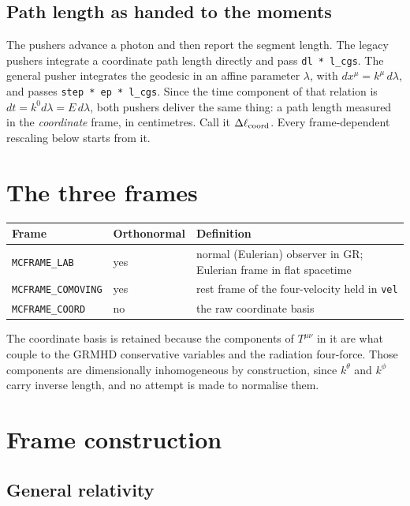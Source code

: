 \documentclass[11pt]{article}
\begin{document}
\subsection{Path length as handed to the moments}

The pushers advance a photon and then report the segment length. The legacy pushers
integrate a coordinate path length directly and pass \texttt{dl * l\_cgs}. The general
pusher integrates the geodesic in an affine parameter $\lambda$, with
$dx^\mu = k^\mu \, d\lambda$, and passes \texttt{step * ep * l\_cgs}. Since the time
component of that relation is $dt = k^0 d\lambda = E\, d\lambda$, both pushers deliver the
same thing: a path length measured in the \emph{coordinate} frame, in centimetres. Call it
$\Delta \ell_{\rm coord}$. Every frame-dependent rescaling below starts from it.

\section{The three frames}

\begin{table}[h]
\centering
\begin{tabular}{lll}
\toprule
Frame & Orthonormal & Definition \\
\midrule
\texttt{MCFRAME\_LAB}      & yes & normal (Eulerian) observer in GR; Eulerian frame in flat spacetime \\
\texttt{MCFRAME\_COMOVING} & yes & rest frame of the four-velocity held in \texttt{vel} \\
\texttt{MCFRAME\_COORD}    & no  & the raw coordinate basis \\
\bottomrule
\end{tabular}
\end{table}

The coordinate basis is retained because the components of $T^{\mu\nu}$ in it are what
couple to the GRMHD conservative variables and the radiation four-force. Those components
are dimensionally inhomogeneous by construction, since $k^\theta$ and $k^\phi$ carry
inverse length, and no attempt is made to normalise them.

\section{Frame construction}
\label{sec:construct}

\subsection{General relativity}
\end{document}
